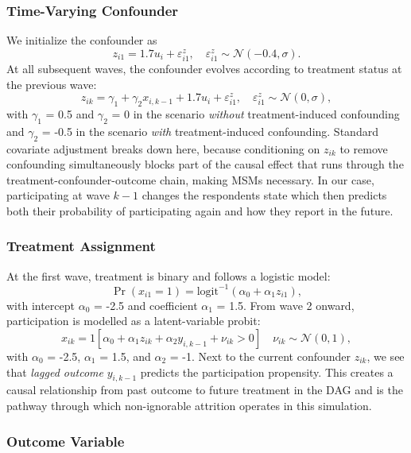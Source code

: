 \documentclass[
  letterpaper,
  DIV=11,
  numbers=noendperiod]{scrartcl}
\begin{document}
\subsubsection{Time-Varying Confounder}\label{time-varying-confounder}

We initialize the confounder as
\[ z_{i1} = 1.7u_i + \varepsilon_{i1}^z, \quad \varepsilon_{i1}^z \sim \mathcal{N}(-0.4, \sigma). \]
At all subsequent waves, the confounder evolves according to treatment
status at the previous wave:
\[ z_{ik} = \gamma_1 + \gamma_2x_{i, k-1} + 1.7u_i + \varepsilon_{i1}^z, \quad \varepsilon_{i1}^z \sim \mathcal{N}(0, \sigma), \]
with \(\gamma_1\) = 0.5 and \(\gamma_2\) = 0 in the scenario
\emph{without} treatment-induced confounding and \(\gamma_2\) = -0.5 in
the scenario \emph{with} treatment-induced confounding. Standard
covariate adjustment breaks down here, because conditioning on
\(z_{ik}\) to remove confounding simultaneously blocks part of the
causal effect that runs through the treatment-confounder-outcome chain,
making MSMs necessary. In our case, participating at wave \(k-1\)
changes the respondents state which then predicts both their probability
of participating again and how they report in the future.

\subsubsection{Treatment Assignment}\label{treatment-assignment}

At the first wave, treatment is binary and follows a logistic model:
\[\Pr(x_{i1} = 1) = \text{logit}^{-1}(\alpha_0 + \alpha_1z_{i1}),\] with
intercept \(\alpha_0\) = -2.5 and coefficient \(\alpha_1\) = 1.5. From
wave 2 onward, participation is modelled as a latent-variable probit:
\[ x_{ik} = 1[\alpha_0 + \alpha_1z_{ik} + \alpha_2y_{i, k-1} + \nu_{ik} > 0] \quad \nu_{ik} \sim \mathcal{N}(0,1), \]
with \(\alpha_0\) = -2.5, \(\alpha_1\) = 1.5, and \(\alpha_2\) = -1.
Next to the current confounder \(z_{ik}\), we see that \emph{lagged
outcome} \(y_{i, k-1}\) predicts the participation propensity. This
creates a causal relationship from past outcome to future treatment in
the DAG and is the pathway through which non-ignorable attrition
operates in this simulation.

\subsubsection{Outcome Variable}\label{outcome-variable}
\end{document}
